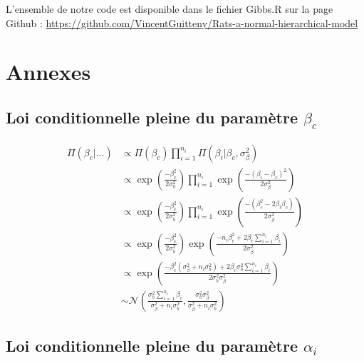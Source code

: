 \documentclass[
]{article}
\begin{document}
L'ensemble de notre code est disponible dans le fichier Gibbs.R sur la
page Github :
\url{https://github.com/VincentGuitteny/Rats-a-normal-hierarchical-model}

\newpage

\hypertarget{annexes}{%
\section{Annexes}\label{annexes}}

\hypertarget{loi-conditionnelle-pleine-du-paramuxe8tre-beta_c}{%
\subsection{\texorpdfstring{Loi conditionnelle pleine du paramètre
\(\beta_c\)}{Loi conditionnelle pleine du paramètre \textbackslash beta\_c}}\label{loi-conditionnelle-pleine-du-paramuxe8tre-beta_c}}

\begin{align*}
\Pi(\beta_{c}|...) &\propto \Pi(\beta_{c}) \prod_{i=1}^{n_{i}} \Pi(\beta_{i}|\beta_{c},\sigma_{\beta}^{2} ) \\
        &\propto \exp\left(\frac{-\beta_{c}^{2}}{2\sigma_{b}^{2}}\right)\prod_{i=1}^{n_{i}} \exp\left(\frac{-(\beta_{i}-\beta_{c})^{2}}{2\sigma_{\beta}^{2}}\right) \\
        &\propto \exp\left(\frac{-\beta_{c}^{2}}{2\sigma_{b}^{2}}\right)\prod_{i=1}^{n_{i}} \exp\left(\frac{-(\beta_{c}^{2}-2\beta_{i}\beta_{c})}{2\sigma_{\beta}^{2}}\right) \\
        &\propto \exp\left(\frac{-\beta_{c}^{2}}{2\sigma_{b}^{2}}\right) \exp\left(\frac{-n_i\beta_{c}^{2}+2\beta_{c}\sum\limits_{i=1}^{n_{i}} \beta_{i}}{2\sigma_{\beta}^{2}}\right)\\
        &\propto \exp\left(\frac{-\beta_{c}^{2}(\sigma_{\beta}^{2}+n_i\sigma_{b}^{2}) +2\beta_{c}\sigma_{b}^{2}\sum\limits_{i=1}^{n_{i}} \beta_{i}}{2\sigma_{b}^{2}\sigma_{\beta}^{2}}\right)\\
        &\sim \mathcal{N}\left(\frac{\sigma_{b}^{2}\sum\limits_{i=1}^{n_{i}} \beta_{i}}{\sigma_{\beta}^{2}+n_{i}\sigma_{b}^{2}},\frac{\sigma_{b}^{2}\sigma_{\beta}^{2}}{\sigma_{\beta}^{2}+n_{i}\sigma_{b}^{2}}\right)
\end{align*}

\hypertarget{loi-conditionnelle-pleine-du-paramuxe8tre-alpha_i}{%
\subsection{\texorpdfstring{Loi conditionnelle pleine du paramètre
\(\alpha_i\)}{Loi conditionnelle pleine du paramètre \textbackslash alpha\_i}}\label{loi-conditionnelle-pleine-du-paramuxe8tre-alpha_i}}
\end{document}
